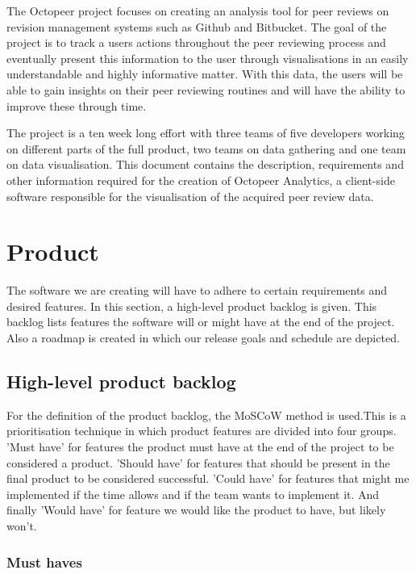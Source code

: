 \documentclass{article}
\begin{document}
The Octopeer project focuses on creating an analysis tool for peer reviews on revision management systems such as Github and Bitbucket. The goal of the project is to track a users actions throughout the peer reviewing process and eventually present this information to the user through visualisations in an easily understandable and highly informative matter. With this data, the users will be able to gain insights on their peer reviewing routines and will have the ability to improve these through time.

The project is a ten week long effort with three teams of five developers working on different parts of the full product, two teams on data gathering and one team on data visualisation. This document contains the description, requirements and other information required for the creation of Octopeer Analytics, a client-side software responsible for the visualisation of the acquired peer review data.

\section{Product}

The software we are creating will have to adhere to certain requirements and desired features. In this section, a high-level product backlog is given. This backlog lists features the software will or might have at the end of the project. Also a roadmap is created in which our release goals and schedule are depicted. 

    \subsection{High-level product backlog} \label{HL Product BL}
    
    For the definition of the product backlog, the MoSCoW method is used.This is a prioritisation technique in which product features are divided into four groups. 'Must have' for features the product must have at the end of the project to be considered a product. 'Should have' for features that should be present in the final product to be considered successful. 'Could have' for features that might me implemented if the time allows and if the team wants to implement it. And finally 'Would have' for feature we would like the product to have, but likely won't. 
    
    \subsubsection{Must haves}
    
\end{document}
